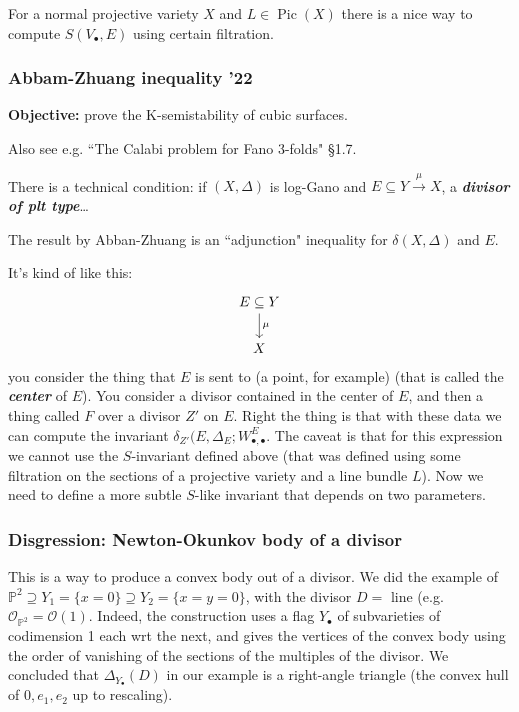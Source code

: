 \begin{remark}\leavevmode
For a normal projective variety \(X\) and \(L \in \operatorname{Pic}(X)\) there is a nice way to compute \(S(V_\bullet,E)\) using certain filtration.
\end{remark}

\subsubsection{Abbam-Zhuang inequality '22}

\textbf{Objective:} prove the K-semistability of cubic surfaces.

Also see e.g. ``The Calabi problem for Fano 3-folds" §1.7.

There is a technical condition: if \((X,\Delta)\) is log-Gano and \(E \subseteq Y \xrightarrow{\mu}X\), a \textit{\textbf{divisor of plt type}}…

The result by Abban-Zhuang is an ``adjunction" inequality for \(\delta(X,\Delta)\) and \(E\).

It's kind of like this:
\[\begin{tikzcd}
E \subseteq Y\arrow[d,"\mu"]\\
X
\end{tikzcd}\]
you consider the thing that \(E\) is sent to (a point, for example) (that is called the \textit{\textbf{center}} of \(E\)). You consider a divisor contained in the center of \(E\), and then a thing called \(F\) over a divisor \(Z'\) on \(E\). Right the thing is that with these data we can compute the invariant \(\delta_{Z'}(E,\Delta_E;W^E_{\bullet,\bullet}\). The caveat is that for this expression we cannot use the \(S\)-invariant defined above (that was defined using some filtration on the sections of a projective variety and a line bundle \(L\)). Now we need to define a more subtle \(S\)-like invariant that depends on two parameters.

\subsubsection{Disgression: Newton-Okunkov body of a divisor}

This is a way to produce a convex body out of a divisor. We did the example of \(\mathbb{P}^2 \supseteq Y_1=\{x=0\}\supseteq Y_2=\{x=y=0\}\), with the divisor \(D=\) line (e.g. \(\mathcal{O}_{\mathbb{P}^2}=\mathcal{O}(1)\). Indeed, the construction uses a flag \(Y_\bullet\) of subvarieties of codimension 1 each wrt the next, and gives the vertices of the convex body using the order of vanishing of the sections of the multiples of the divisor. We concluded that \(\Delta_{Y_\bullet}(D)\) in our example is a right-angle triangle (the convex hull of \(0,e_1,e_2\) up to rescaling).

